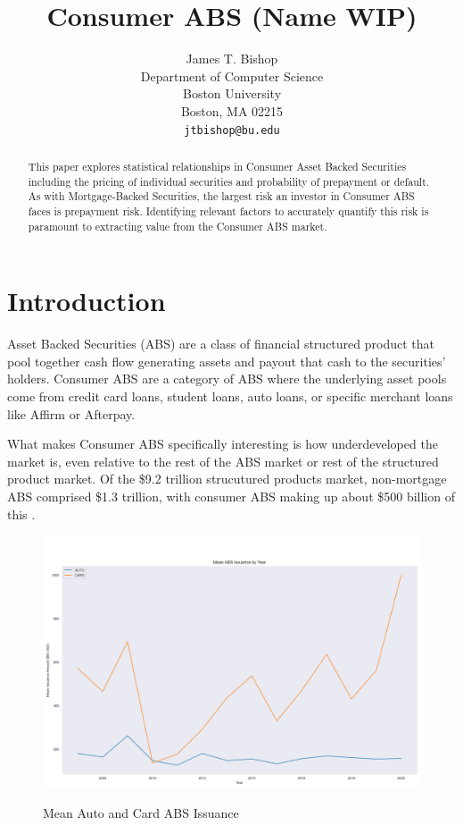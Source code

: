 \documentclass{article}
\title{Consumer ABS (Name WIP)}
\author{%

  James T. Bishop \\
  Department of Computer Science \\
  Boston University \\
  Boston, MA 02215 \\
  \texttt{jtbishop@bu.edu}
}
\begin{document}
\maketitle

\begin{abstract}
  This paper explores statistical relationships in Consumer Asset Backed Securities including the pricing of individual securities and probability of prepayment or default. As with Mortgage-Backed Securities, the largest risk an investor in Consumer ABS faces is prepayment risk. Identifying relevant factors to accurately quantify this risk is paramount to extracting value from the Consumer ABS market. 
\end{abstract}


\section*{Introduction}
Asset Backed Securities (ABS) are a class of financial structured product that pool together cash flow generating assets and payout that cash to the securities' holders. Consumer ABS are a category of ABS where the underlying asset pools come from credit card loans, student loans, auto loans, or specific merchant loans like Affirm or Afterpay. 

What makes Consumer ABS specifically interesting is how underdeveloped the market is, even relative to the rest of the ABS market or rest of the structured product market. Of the \$9.2 trillion strucutured products market, non-mortgage ABS comprised \$1.3 trillion, with consumer ABS making up about \$500 billion of this . 

\begin{figure}[h]
\includegraphics[scale=0.3]{meanIssuanceByYear}
\centering
\label{fig:meanABSIssuance}
\caption{Mean Auto and Card ABS Issuance}
\end{figure}
\end{document}
